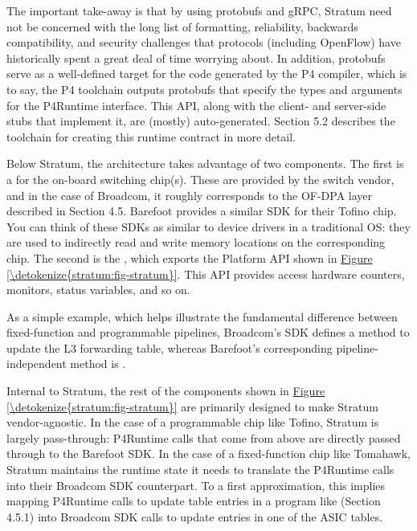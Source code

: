 \documentclass[letterpaper,11pt,english]{sphinxmanual}
\begin{document}
The important take-away is that by using protobufs and gRPC, Stratum
need not be concerned with the long list of formatting, reliability,
backwards compatibility, and security challenges that protocols
(including OpenFlow) have historically spent a great deal of time
worrying about. In addition, protobufs serve as a well-defined target
for the code generated by the P4 compiler, which is to say, the P4
toolchain outputs protobufs that specify the types and arguments for
the P4Runtime interface. This API, along with the client- and
server-side stubs that implement it, are (mostly) auto-generated.
Section 5.2 describes the toolchain for creating this
runtime contract in more detail.

Below Stratum, the architecture takes advantage of two components. The
first is a  for the on-board switching
chip(s). These are provided by the switch vendor, and in the case of
Broadcom, it roughly corresponds to the OF-DPA layer described in
Section 4.5. Barefoot provides a similar SDK for their Tofino
chip. You can think of these SDKs as similar to device drivers in a
traditional OS: they are used to indirectly read and write memory
locations on the corresponding chip. The second is the , which exports the Platform API shown in \hyperref[\detokenize{stratum:fig-stratum}]{Figure \ref{\detokenize{stratum:fig-stratum}}}. This API provides access hardware counters, monitors,
status variables, and so on.

As a simple example, which helps illustrate the fundamental difference
between fixed-function and programmable pipelines, Broadcom’s SDK
defines a  method to update the L3 forwarding
table, whereas Barefoot’s corresponding pipeline-independent method is
.

Internal to Stratum, the rest of the components shown in
\hyperref[\detokenize{stratum:fig-stratum}]{Figure \ref{\detokenize{stratum:fig-stratum}}} are primarily designed to make
Stratum vendor-agnostic. In the case of a programmable chip like
Tofino, Stratum is largely pass-through: P4Runtime calls that come
from above are directly passed through to the Barefoot SDK. In the
case of a fixed-function chip like Tomahawk, Stratum maintains the
runtime state it needs to translate the P4Runtime calls into their
Broadcom SDK counterpart. To a first approximation, this implies
mapping P4Runtime calls to update table entries in a program like
 (Section 4.5.1) into Broadcom SDK calls to update
entries in one of the ASIC tables.
\end{document}
